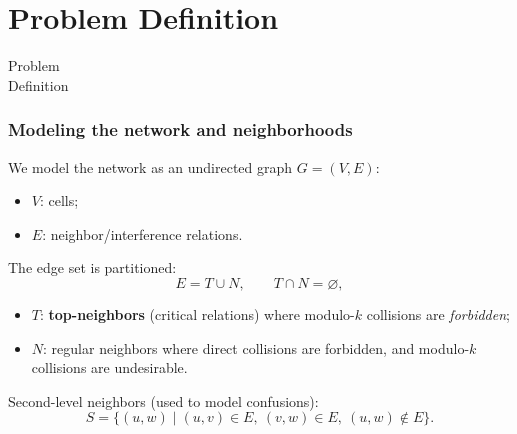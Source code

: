 \documentclass[
	11pt, %
	aspectratio=169, %
]{beamer}
\begin{document}

\section{Problem Definition}

\begin{frame}[plain]
\begin{center}
{\Huge Problem \\ Definition}
\end{center}
\end{frame}

\begin{frame}
\frametitle{Modeling the network and neighborhoods}

We model the network as an undirected graph $G = (V,E)$:
\begin{itemize}
\item $V$: cells;
\item $E$: neighbor/interference relations.
\end{itemize}

The edge set is partitioned:
\[
E = T \cup N,\qquad T \cap N = \varnothing,
\]
\begin{itemize}
\item $T$: \textbf{top-neighbors} (critical relations) where modulo-$k$ collisions are \emph{forbidden};
\item $N$: regular neighbors where direct collisions are forbidden, and modulo-$k$ collisions are undesirable.
\end{itemize}

Second-level neighbors (used to model confusions):
\[
S = \{(u,w)\mid (u,v)\in E,\ (v,w)\in E,\ (u,w)\notin E\}.
\]

\end{frame}
\end{document}
